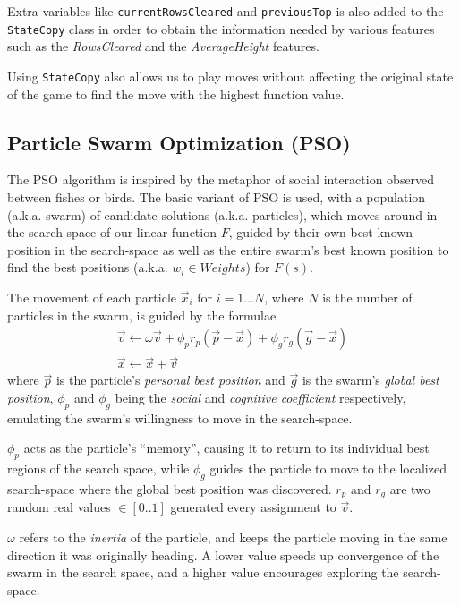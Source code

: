 \documentclass[12pt]{article}
\numberwithin{table}{section}
\begin{document}
Extra variables like \texttt{currentRowsCleared} and \texttt{previousTop} is also added to the \texttt{StateCopy} class in order to obtain the information needed by various features such as the \emph{RowsCleared} and the \emph{AverageHeight} features.

Using \texttt{StateCopy} also allows us to play moves without affecting the original state of the game to find the move with the highest function value.

\subsection{Particle Swarm Optimization (PSO)} \label{PSO}
The PSO algorithm is inspired by the metaphor of social interaction observed between fishes or birds.
The basic variant of PSO is used, with a population (a.k.a. swarm) of candidate solutions (a.k.a. particles), which moves around in the search-space of our linear function $F$, guided by their own best known position in the search-space as well as the entire swarm's best known position to find the best positions (a.k.a. $w_i \in Weights$) for $F(s)$.

The movement of each particle $\vec{x}_i$ for $i=1...N$, where $N$ is the number of particles in the swarm, is guided by the formulae
\begin{gather*}
\vec{v}\leftarrow \omega\vec{v} + \phi_p r_p ( \vec{p} - \vec{x} ) + \phi_g r_g ( \vec{g} - \vec{x} )
\\
\vec{x}\leftarrow \vec{x} + \vec{v}
\end{gather*}
where $\vec{p}$ is the particle's \emph{personal best position} and $\vec{g}$ is the swarm's \emph{global best position}, $\phi_p$ and $\phi_g$ being the \emph{social} and \emph{cognitive coefficient} respectively, emulating the swarm's willingness to move in the search-space. 

$\phi_p$ acts as the particle's ``memory'', causing it to return to its individual best regions of the search space, while $\phi_g$ guides the particle to move to the localized search-space where the global best position was discovered. $r_p$ and $r_g$ are two random real values $\in\left[0..1\right]$ generated every assignment to $\vec{v}$. 

$\omega$ refers to the \emph{inertia} of the particle, and keeps the particle moving in the same direction it was originally heading. A lower value speeds up convergence of the swarm in the search space, and a higher value encourages exploring the search-space.
\end{document}
